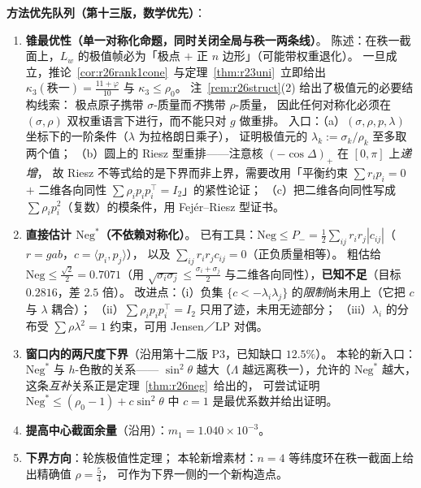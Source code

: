 \documentclass[UTF8,11pt]{ctexart}
\theoremstyle{definition}
\newcommand{\Lam}{\Lambda}
\begin{document}
\textbf{方法优先队列（第十三版，数学优先）}：
\begin{enumerate}\itemsep2pt
\item[\textbf{P1}] \textbf{锥最优性（单一对称化命题，同时关闭全局与秩一两条线）}。
陈述：在秩一截面上，$L_w$ 的极值帧必为「极点 $+$ 正 $n$ 边形」（可能带权重退化）。
一旦成立，推论~\ref{cor:r26rank1cone}~与定理~\ref{thm:r23uni}~立即给出
$\kappa_3(\text{秩一})=\frac{11+\varphi}{10}$ 与 $\kappa_3\le\rho_0$。
注~\ref{rem:r26struct}(2) 给出了极值元的必要结构线索：
极点原子携带 $\sigma$-质量而\emph{不}携带 $\rho$-质量，
因此任何对称化必须在 $(\sigma,\rho)$ 双权重语言下进行，而不能只对 $g$ 做重排。
入口：（a）$(\sigma,\rho,p,\lambda)$ 坐标下的一阶条件（$\lambda$ 为拉格朗日乘子），
证明极值元的 $\lambda_k:=\sigma_k/\rho_k$ 至多取两个值；
（b）圆上的 Riesz 型重排——注意核 $(-\cos\Delta)_+$ 在 $[0,\pi]$ 上\emph{递增}，
故 Riesz 不等式给的是下界而非上界，需要改用「平衡约束 $\sum r_ip_i=0$ $+$ 二维各向同性
$\sum\rho_ip_ip_i^\top=I_2$」的紧性论证；
（c）把二维各向同性写成 $\sum\rho_ip_i^2$（复数）的模条件，用 Fej\'er--Riesz 型证书。
\item[\textbf{P2}] \textbf{直接估计 $\mathrm{Neg}^*$（不依赖对称化）}。
已有工具：$\mathrm{Neg}\le P_-=\frac12\sum_{ij}r_ir_j|c_{ij}|$（$r=gab$，$c=\langle p_i,p_j\rangle$），
以及 $\sum_{ij}r_ir_jc_{ij}=0$（正负质量相等）。
粗估给 $\mathrm{Neg}\le\frac{\sqrt2}2=0.7071$（用 $\sqrt{\sigma_i\sigma_j}\le\frac{\sigma_i+\sigma_j}2$
与二维各向同性），\textbf{已知不足}（目标 $0.2816$，差 $2.5$ 倍）。
改进点：（i）负集 $\{c<-\lambda_i\lambda_j\}$ 的\emph{限制}尚未用上（它把 $c$ 与 $\lambda$ 耦合）；
（ii）$\sum\rho_ip_ip_i^\top=I_2$ 只用了迹，未用无迹部分；
（iii）$\lambda_i$ 的分布受 $\sum\rho\lambda^2=1$ 约束，可用 Jensen／LP 对偶。
\item[\textbf{P3}] \textbf{窗口内的两尺度下界}（沿用第十二版 P3，已知缺口 $12.5\%$）。
本轮的新入口：$\mathrm{Neg}^*$ 与 $h$-色散的关系——
$\sin^2\theta$ 越大（$\Lam$ 越远离秩一），允许的 $\mathrm{Neg}^*$ 越大，
这条\emph{互补}关系正是定理~\ref{thm:r26neg}~给出的，
可尝试证明 $\mathrm{Neg}^*\le(\rho_0-1)+c\sin^2\theta$ 中 $c=1$ 是最优系数并给出证明。
\item[\textbf{P4}] \textbf{提高中心截面余量}（沿用）：$m_1=1.040\times10^{-3}$。
\item[\textbf{副}] \textbf{下界方向}：轮族极值性定理；
本轮新增素材：$n=4$ 等纬度环在秩一截面上给出精确值 $\rho=\frac54$，
可作为下界一侧的一个新构造点。
\end{enumerate}
\end{document}

